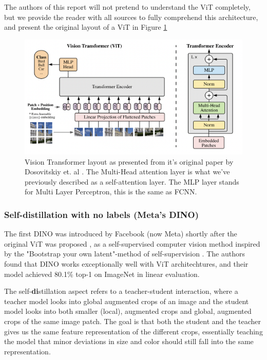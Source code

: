The authors of this 
report will not pretend to understand the ViT completely, but we provide the reader with all sources
to fully comprehend this architecture, and present the original layout of a ViT in Figure \ref{fig:ViT}

\begin{figure}[H]
    \centering
    \includegraphics[width=1\linewidth]{examples/tests_eb/figs/vit.png}
    \caption{Vision Transformer layout as presented from it's original paper by Dosovitskiy et. al \cite{first_vit}. The Multi-Head attention layer is what we've previously described as a self-attention layer. The MLP layer stands for Multi Layer Perceptron, this is the same as FCNN.}
    \label{fig:ViT}
\end{figure}

\subsubsection{Self-\textbf{di}stillation with \textbf{no} labels (Meta's \textbf{DINO})} \label{sssec:dino}
The first DINO was introduced by Facebook (now Meta) shortly after the original ViT was proposed \cite{dino1}, as a self-supervised computer vision method inspired by the "Bootstrap your own latent"-method of self-supervision \cite{byol}. The authors found that DINO works exceptionally well with ViT architechtures, and their model achieved 80.1\% top-1 on ImageNet in linear evaluation.  

The self-\textbf{di}stillation aspect refers to a teacher-student interaction, where a teacher model looks into global augmented crops of an image and the student model looks into both smaller (local), augmented crops and global, augmented crops of the same image patch. The goal is that both the student and the teacher gives us the same feature representation of the different crops, essentially teaching the model that minor deviations in size and color should still fall into the same representation. 

